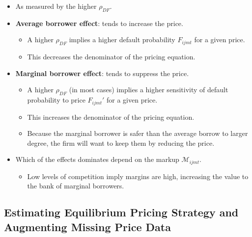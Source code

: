 \documentclass[
]{book}
\providecommand{\tightlist}{%
  \setlength{\itemsep}{0pt}\setlength{\parskip}{0pt}}
\begin{document}
\begin{itemize}
\tightlist
\item
  As measured by the higher \(\rho_{DF}\).
\item
  \textbf{Average borrower effect}: tends to increase the price.

  \begin{itemize}
  \tightlist
  \item
    A higher \(\rho_{DF}\) implies a higher default probability \(F_{ijmt}\) for a given price.
  \item
    This decreases the denominator of the pricing equation.
  \end{itemize}
\item
  \textbf{Marginal borrower effect}: tends to suppress the price.

  \begin{itemize}
  \tightlist
  \item
    A higher \(\rho_{DF}\) (in most cases) implies a higher sensitivity of default probability to price \(F_{ijmt}'\) for a given price.
  \item
    This increases the denominator of the pricing equation.
  \item
    Because the marginal borrower is safer than the average borrow to larger degree, the firm will want to keep them by reducing the price.
  \end{itemize}
\item
  Which of the effects dominates depend on the markup \(\mathcal{M}_{ijmt}\).

  \begin{itemize}
  \tightlist
  \item
    Low levels of competition imply margins are high, increasing the value to the bank of marginal borrowers.
  \end{itemize}
\end{itemize}

\hypertarget{estimating-equilibrium-pricing-strategy-and-augmenting-missing-price-data}{%
\subsection{Estimating Equilibrium Pricing Strategy and Augmenting Missing Price Data}\label{estimating-equilibrium-pricing-strategy-and-augmenting-missing-price-data}}
\end{document}
